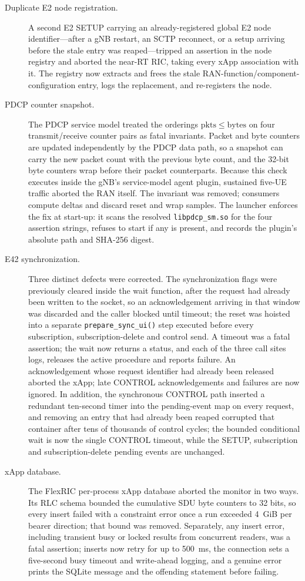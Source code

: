 \begin{description}
\item[Duplicate E2 node registration.] A second E2 SETUP carrying an already-registered global E2 node identifier---after a gNB restart, an SCTP reconnect, or a setup arriving before the stale entry was reaped---tripped an assertion in the node registry and aborted the near-RT RIC, taking every xApp association with it. The registry now extracts and frees the stale RAN-function/component-configuration entry, logs the replacement, and re-registers the node.
\item[PDCP counter snapshot.] The PDCP service model treated the orderings $\mathrm{pkts}\leq\mathrm{bytes}$ on four transmit/receive counter pairs as fatal invariants. Packet and byte counters are updated independently by the PDCP data path, so a snapshot can carry the new packet count with the previous byte count, and the 32-bit byte counters wrap before their packet counterparts. Because this check executes inside the gNB's service-model agent plugin, sustained five-UE traffic aborted the RAN itself. The invariant was removed; consumers compute deltas and discard reset and wrap samples. The launcher enforces the fix at start-up: it scans the resolved \texttt{libpdcp\_sm.so} for the four assertion strings, refuses to start if any is present, and records the plugin's absolute path and SHA-256 digest.
\item[E42 synchronization.] Three distinct defects were corrected. The synchronization flags were previously cleared inside the wait function, after the request had already been written to the socket, so an acknowledgement arriving in that window was discarded and the caller blocked until timeout; the reset was hoisted into a separate \texttt{prepare\_sync\_ui()} step executed before every subscription, subscription-delete and control send. A timeout was a fatal assertion; the wait now returns a status, and each of the three call sites logs, releases the active procedure and reports failure. An acknowledgement whose request identifier had already been released aborted the xApp; late CONTROL acknowledgements and failures are now ignored. In addition, the synchronous CONTROL path inserted a redundant ten-second timer into the pending-event map on every request, and removing an entry that had already been reaped corrupted that container after tens of thousands of control cycles; the bounded conditional wait is now the single CONTROL timeout, while the SETUP, subscription and subscription-delete pending events are unchanged.
\item[xApp database.] The FlexRIC per-process xApp database aborted the monitor in two ways. Its RLC schema bounded the cumulative SDU byte counters to 32 bits, so every insert failed with a constraint error once a run exceeded 4~GiB per bearer direction; that bound was removed. Separately, any insert error, including transient busy or locked results from concurrent readers, was a fatal assertion; inserts now retry for up to 500~ms, the connection sets a five-second busy timeout and write-ahead logging, and a genuine error prints the SQLite message and the offending statement before failing.
\end{description}


